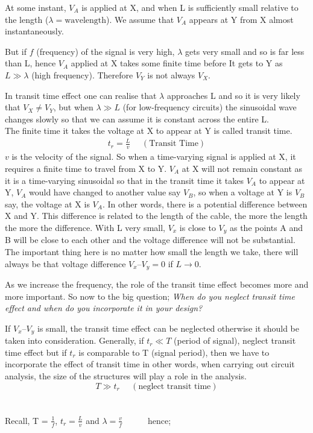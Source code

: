 At some instant, $ V_{A} $ is applied at X, and when L is sufficiently small relative to the length ($  \lambda = \text{wavelength} $). We assume that $ V_{A} $ appears at Y from X almost instantaneously.

But if $f$ (frequency) of the signal is very high, $\lambda $ gets very small and so is far less than L, hence  $  V_{A} $ applied at X takes some finite time before It gets to Y as $  L\gg \lambda $ (high frequency). Therefore $  V_{Y} $ is not always $  V_{X} $.

In transit time effect one can realise that $ \lambda $  approaches L and so it is very likely that $ V_{X} \neq V_{Y} $, but when $  \lambda \gg L  $ (for low-frequency circuits) the sinusoidal wave changes slowly so that we can assume it is constant across the entire L.\\
The finite time it takes the voltage at X to appear at Y is called transit time.
\begin{align}
 t_{r} = \frac{L}{v}\ \ \ \ \ \ (\text{Transit  Time})
\end{align}
$v$ is the velocity of the signal. So when a time-varying signal is applied at X, it requires a finite time to travel from X to Y.  $ V_{A} $  at X will not remain constant as it is a time-varying sinusoidal so that in the transit time it takes $ V_{A} $ to appear at Y, $ V_{A} $ would have changed to another value say $ V_{B} $, so when a voltage at Y is $ V_{B} $ say, the voltage at X is $ V_{A} $. In other words, there is a potential difference between X and Y. This difference is related to the length of the cable, the more the length the more the difference. With L very small, $ V_{x} $ is close to $ V_{y} $ as the points A and B will be close to each other and the voltage difference will not be substantial. The important thing here is no matter how small the length we take, there will always be that voltage difference $ V_{x} – V_{y} = 0 $ if $ L \rightarrow 0 $.

As we increase the frequency, the role of the transit time effect becomes more and more important. So now to the big question; \textit{When do you neglect transit time effect and when do you incorporate it in your design?}

If $ V_{x} – V_{y} $ is small, the transit time effect can be neglected otherwise it should be taken into consideration. Generally, if  $ t_{r} \ll T $ (period of signal), neglect transit time effect but if $ t_{r} $ is comparable to T (signal period), then we have to incorporate the effect of transit time in other words, when carrying out circuit analysis, the size of the structures will play a role in the analysis.
$$ T \gg t_{r}\ \ \ \ \ \ (\text{neglect transit time})$$\\\\
 Recall, T = $   \frac{1}{f}  $, $ t_{r} = \frac{L}{v} $ and $ \lambda = \frac{v}{f} $\ \ \ \ \ \ hence; 

